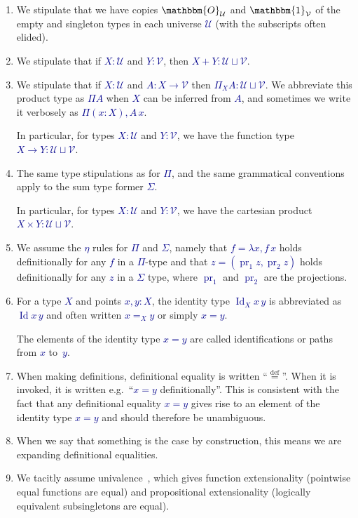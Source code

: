 \documentclass[10pt]{article}
\newcommand{\db}{\textcolor{darkblue}}
\newcommand{\m}[1]{\db{$#1$}}
\newcommand{\fst}{\operatorname{pr}_1}
\newcommand{\snd}{\operatorname{pr}_2}
\newcommand{\U}{\mathcal{U}}
\newcommand{\V}{\mathcal{V}}
\newcommand{\Zero}{\mathbbm{O}}
\newcommand{\One}{\mathbbm{1}}
\newcommand{\Id}{\operatorname{Id}}
\newcommand{\eqdef}{\overset{\text{def}}{=}}
\newcommand{\idto}{=}
\theoremstyle{definition}
\begin{document}
\begin{enumerate}
\item We stipulate that we have copies \m{\Zero_\U} and \m{\One_\V} of the
  empty and singleton types in each universe \m{\U} (with the subscripts
  often elided).
\item We stipulate that if \m{X : \U} and \m{Y : \V}, then \m{X+Y : \U \sqcup \V}.
\item We stipulate that if \m{X : \U} and \m{A : X \to \V} then
  \m{\Pi_X A : \U \sqcup \V}. We abbreviate this product type as \m{\Pi A}
  when \m{X} can be inferred from \m{A}, and sometimes we write it
  verbosely as \m{\Pi (x:X), A \, x}.

  In particular, for types \m{X : \U} and \m{Y : \V}, we have the function
  type \m{X \to Y : \U \sqcup \V}.
\item The same type stipulations as for \m{\Pi}, and the same
  grammatical conventions apply to the sum type former \m{\Sigma}.

  In particular, for types \m{X : \U} and \m{Y : \V}, we have the cartesian product \m{X \times Y : \U \sqcup \V}.

\item We assume the \m{\eta} rules for \m{\Pi} and \m{\Sigma}, namely
  that \m{f = \lambda x, f \, x} holds definitionally for any \m{f} in
  a \m{\Pi}-type and that \m{z=(\fst z , \snd z)} holds definitionally
  for any \m{z} in a \m{\Sigma} type, where \m{\fst} and \m{\snd} are
  the projections.

\item For a type \m{X} and points \m{x,y:X}, the identity type \m{\Id_{X} x \, y} is abbreviated as \m{\Id x \, y} and often written \m{x \idto_X y} or simply \m{x \idto y}.

  The elements of the identity type \m{x=y} are called identifications
  or paths from \m{x} to~\m{y}.

\item When making definitions, definitional equality is written ``$\eqdef$''. When it is invoked, it is written e.g.\ ``\m{x = y} definitionally''. This is consistent with the fact that any definitional equality \m{x = y} gives rise to an element of the identity type \m{x = y} and should therefore be unambiguous.

\item When we say that something is the case by construction, this means we
  are expanding definitional equalities.

\item We tacitly assume univalence~\cite{hottbook}, which gives
  function extensionality (pointwise equal functions are equal) and
  propositional extensionality (logically equivalent subsingletons are
  equal).


\end{enumerate}
\end{document}
